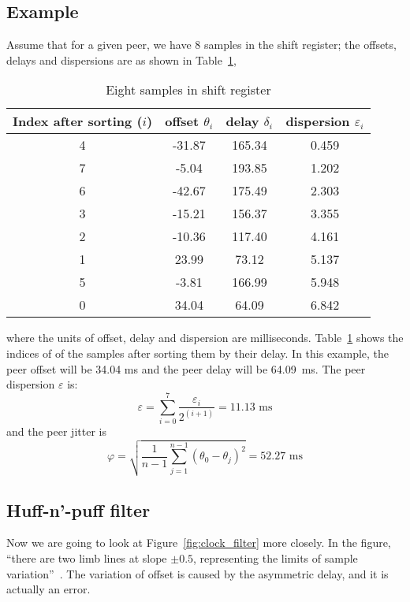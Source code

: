 \subsection{Example}%
\label{sub:example}
Assume that for a given peer, we have 8 samples in the shift register; the
offsets, delays and dispersions are as shown in Table~\ref{tab:clock_filter},
\begin{table}[htpb]
    \centering
    \caption{Eight samples in shift register}
    \label{tab:clock_filter}
    \begin{tabular}{|c|c|c|c|}
        \hline
        Index after sorting ($i$) & offset $\theta_i$ & delay $\delta_i$ 
        & dispersion $\varepsilon_i$ \\
        \hline
        4& -31.87&  165.34&  0.459\\
        \hline
        7&  -5.04&  193.85&  1.202\\
        \hline
        6& -42.67&  175.49&  2.303\\
        \hline
        3& -15.21&  156.37&  3.355\\
        \hline
        2& -10.36&  117.40&  4.161\\
        \hline
        1&  23.99&   73.12&  5.137\\
        \hline
        5&  -3.81&  166.99&  5.948\\
        \hline
        0&  34.04&   64.09&  6.842\\
        \hline
    \end{tabular}
\end{table}
where the units of offset, delay and dispersion are milliseconds.
Table~\ref{tab:clock_filter} shows the indices of of the samples after sorting
them by their delay. In this example, the peer offset will be 34.04 ms and the
peer delay will be 64.09~ms. The peer dispersion $\varepsilon$ is:
$$ \varepsilon = \sum^{7}_{i=0} \frac{\varepsilon_i}{2^{(i+1)}} = 11.13
\text{ ms} $$
and the peer jitter is 
$$
    \varphi = \sqrt{\frac{1}{n-1} \sum^{n-1}_{j=1} (\theta_0 - \theta_j)^2}
    = 52.27 \text{ ms}
$$

\subsection{Huff-n'-puff filter}%
\label{sub:huff_n_puff_filter}
Now we are going to look at Figure~\ref{fig:clock_filter} more closely. In the
figure, ``there are two limb lines at slope $\pm0.5$, representing the
limits of sample variation''~\cite{clock_filter}.
The variation of offset is caused by the asymmetric delay, and it is actually
an error.

